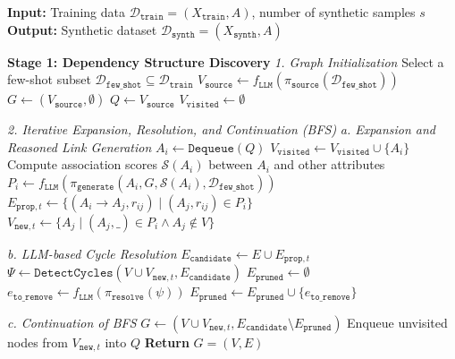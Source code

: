 \begin{algorithm*}
\caption{StructSynth: Structure-Aware Tabular Data Synthesis}
\label{alg:structsynth}
\begin{algorithmic}[1]
\State \textbf{Input:} Training data $\mathcal{D}_{\mathtt{train}} = (X_{\mathtt{train}}, A)$, number of synthetic samples $s$
\State \textbf{Output:} Synthetic dataset $\mathcal{D}_{\mathtt{synth}} = (X_{\mathtt{synth}}, A)$

\vspace{0.2cm}
\Statex \textbf{Stage 1: Dependency Structure Discovery}
\Statex \textit{1. Graph Initialization}
\State Select a few-shot subset $\mathcal{D}_{\mathtt{few\_shot}} \subseteq \mathcal{D}_{\mathtt{train}}$
\State $V_{\mathtt{source}} \gets f_{\mathtt{LLM}}(\pi_{\mathtt{source}}(\mathcal{D}_{\mathtt{few\_shot}}))$
\State $G \gets (V_{\mathtt{source}}, \emptyset)$
\State $Q \gets V_{\mathtt{source}}$ 
\State $V_{\mathtt{visited}} \gets \emptyset$

\Statex \textit{2. Iterative Expansion, Resolution, and Continuation (BFS)}
    \Statex \hspace{\algorithmicindent} \textit{a. Expansion and Reasoned Link Generation}
    \State $A_i \gets \mathtt{Dequeue}(Q)$
    \State $V_{\mathtt{visited}} \gets V_{\mathtt{visited}} \cup \{A_i\}$
    \State Compute association scores $\mathcal{S}(A_i)$ between $A_i$ and other attributes
    \State $P_i \gets f_{\mathtt{LLM}}(\pi_{\mathtt{generate}}(A_i, G, \mathcal{S}(A_i), \mathcal{D}_{\mathtt{few\_shot}}))$
    \State $E_{\mathtt{prop},t} \gets \{(A_i \to A_j, r_{ij}) \mid (A_j, r_{ij}) \in P_i\}$
    \State $V_{\mathtt{new},t} \gets \{A_j \mid (A_j, \_) \in P_i \land A_j \notin V\}$
    
    \Statex \hspace{\algorithmicindent} \textit{b. LLM-based Cycle Resolution}
    \State $E_{\mathtt{candidate}} \gets E \cup E_{\mathtt{prop},t}$
    \State $\Psi \gets \mathtt{DetectCycles}(V \cup V_{\mathtt{new},t}, E_{\mathtt{candidate}})$
    \State $E_{\mathtt{pruned}} \gets \emptyset$
        \State $e_{\mathtt{to\_remove}} \gets f_{\mathtt{LLM}}(\pi_{\mathtt{resolve}}(\psi))$
        \State $E_{\mathtt{pruned}} \gets E_{\mathtt{pruned}} \cup \{e_{\mathtt{to\_remove}}\}$
    \EndFor
    
    \Statex \hspace{\algorithmicindent} \textit{c. Continuation of BFS}
    \State $G \gets (V \cup V_{\mathtt{new},t}, E_{\mathtt{candidate}} \setminus E_{\mathtt{pruned}})$ 
    \State Enqueue unvisited nodes from $V_{\mathtt{new},t}$ into $Q$
\EndWhile
\State \textbf{Return} $G = (V, E)$


\end{algorithmic}
\end{algorithm*}
